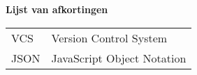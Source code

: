 \Large
\textbf{Lijst van afkortingen}
\newline
\small
\begin{table}[ht]
\small
\begin{tabular}{ll} 
VCS &Version Control System \\
JSON &JavaScript Object Notation
\end{tabular}
\end{table}

\newpage

